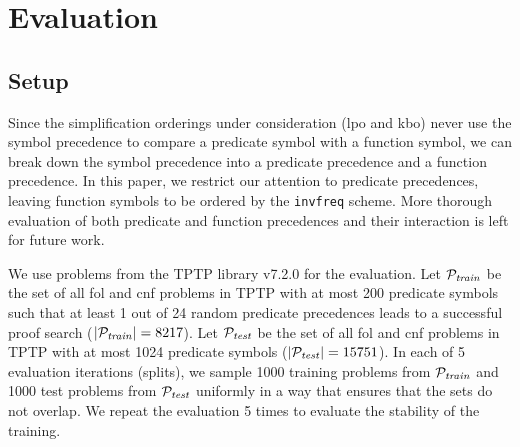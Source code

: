 \documentclass[a4paper]{easychair}
\begin{document}
\section{Evaluation}
\label{sec:evaluation}

\subsection{Setup}

Since the simplification orderings under consideration (\acrshort*{lpo} and \acrshort*{kbo})
never use the symbol precedence to compare a predicate symbol with a function symbol,
we can break down the symbol precedence  into a predicate precedence and a function precedence.
In this paper, we restrict our attention to predicate precedences,
leaving function symbols to be ordered by the \texttt{invfreq} scheme.
More thorough evaluation of both predicate and function precedences and their interaction
is left for future work.

%	
%	
%	
%	

We use problems from the TPTP library v7.2.0 \cite{Sut17} for the evaluation.
Let \(\mathcal{P}_{\mathit{train}}\) be the set of all \acrshort*{fol} and \acrshort*{cnf} problems in TPTP
with at most 200 predicate symbols such that at least 1 out of 24 random predicate precedences
leads to a successful proof search (\(|\mathcal{P}_{\mathit{train}}| = 8217\)).
Let \(\mathcal{P}_{\mathit{test}}\) be the set of all \acrshort*{fol} and \acrshort*{cnf} problems in TPTP
with at most 1024 predicate symbols (\(|\mathcal{P}_{\mathit{test}}| = 15751\)).
In each of 5 evaluation iterations (splits),
we sample 1000 training problems from \(\mathcal{P}_{\mathit{train}}\)
and 1000 test problems from \(\mathcal{P}_{\mathit{test}}\)
uniformly in a way that ensures that the sets do not overlap.
We repeat the evaluation 5 times to evaluate the stability of the training.
\end{document}
